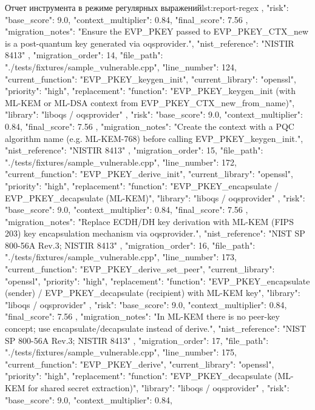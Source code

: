 \documentclass{itmo-vkr}
\begin{document}
\begin{itmolisting}[JSON]{Отчет инструмента в режиме регулярных выражений}{lst:report-regex}
{{{			},
			"risk": {
				"base_score": 9.0,
				"context_multiplier": 0.84,
				"final_score": 7.56
			},
			"migration_notes": "Ensure the EVP_PKEY passed to EVP_PKEY_CTX_new is a post-quantum key generated via oqsprovider.",
			"nist_reference": "NISTIR 8413"
		},
		{
			"migration_order": 14,
			"file_path": "./tests/fixtures/sample_vulnerable.cpp",
			"line_number": 124,
			"current_function": "EVP_PKEY_keygen_init",
			"current_library": "openssl",
			"priority": "high",
			"replacement": {
				"function": "EVP_PKEY_keygen_init (with ML-KEM or ML-DSA context from EVP_PKEY_CTX_new_from_name)",
				"library": "liboqs / oqsprovider"
			},
			"risk": {
				"base_score": 9.0,
				"context_multiplier": 0.84,
				"final_score": 7.56
			},
			"migration_notes": "Create the context with a PQC algorithm name (e.g. ML-KEM-768) before calling EVP_PKEY_keygen_init.",
			"nist_reference": "NISTIR 8413"
		},
		{
			"migration_order": 15,
			"file_path": "./tests/fixtures/sample_vulnerable.cpp",
			"line_number": 172,
			"current_function": "EVP_PKEY_derive_init",
			"current_library": "openssl",
			"priority": "high",
			"replacement": {
				"function": "EVP_PKEY_encapsulate / EVP_PKEY_decapsulate (ML-KEM)",
				"library": "liboqs / oqsprovider"
			},
			"risk": {
				"base_score": 9.0,
				"context_multiplier": 0.84,
				"final_score": 7.56
			},
			"migration_notes": "Replace ECDH/DH key derivation with ML-KEM (FIPS 203) key encapsulation mechanism via oqsprovider.",
			"nist_reference": "NIST SP 800-56A Rev.3; NISTIR 8413"
		},
		{
			"migration_order": 16,
			"file_path": "./tests/fixtures/sample_vulnerable.cpp",
			"line_number": 173,
			"current_function": "EVP_PKEY_derive_set_peer",
			"current_library": "openssl",
			"priority": "high",
			"replacement": {
				"function": "EVP_PKEY_encapsulate (sender) / EVP_PKEY_decapsulate (recipient) with ML-KEM key",
				"library": "liboqs / oqsprovider"
			},
			"risk": {
				"base_score": 9.0,
				"context_multiplier": 0.84,
				"final_score": 7.56
			},
			"migration_notes": "In ML-KEM there is no peer-key concept; use encapsulate/decapsulate instead of derive.",
			"nist_reference": "NIST SP 800-56A Rev.3; NISTIR 8413"
		},
		{
			"migration_order": 17,
			"file_path": "./tests/fixtures/sample_vulnerable.cpp",
			"line_number": 175,
			"current_function": "EVP_PKEY_derive",
			"current_library": "openssl",
			"priority": "high",
			"replacement": {
				"function": "EVP_PKEY_decapsulate (ML-KEM for shared secret extraction)",
				"library": "liboqs / oqsprovider"
			},
			"risk": {
				"base_score": 9.0,
				"context_multiplier": 0.84,
}}}
\end{itmolisting}
\end{document}
